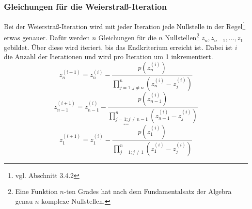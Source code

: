 \documentclass[12pt]{article}
\begin{document}
\subsubsection{Gleichungen für die Weierstraß-Iteration}
Bei der Weierstraß-Iteration wird mit jeder Iteration jede Nullstelle in der Regel\footnote{
    vgl. Abschnitt 3.4.2
} etwas genauer. Dafür werden $n$ Gleichungen für die $n$ Nullstellen\footnote{
    Eine Funktion $n$-ten Grades hat nach dem Fundamentalsatz der Algebra genau $n$ komplexe Nullstellen.
} $z_n,z_{n-1},\dots,z_1$ gebildet. Über diese wird iteriert, bis das Endkriterium erreicht ist. Dabei ist $i$ die Anzahl der Iterationen und wird pro Iteration um 1 inkrementiert.
\[z_n^{(i+1)} = z_n^{(i)} - \frac{p(z_n^{(i)})}{\prod_{j=1;j\neq n}^{n}(z_n^{(i)}-z_j^{(i)})}\]
\[z_{n-1}^{(i+1)} = z_{n-1}^{(i)} - \frac{p(z_{n-1}^{(i)})}{\prod_{j=1;j\neq n-1}^{n}(z_{n-1}^{(i)}-z_j^{(i)})}\]
\vspace{0.25mm}
\[\dots\]
\[z_{1}^{(i+1)} = z_1^{(i)} - \frac{p(z_{1}^{(i)})}{\prod_{j=1;j\neq 1}^{n}(z_{1}^{(i)}-z_j^{(i)})}\]
\end{document}
